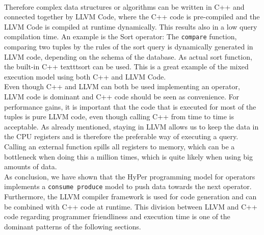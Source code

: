 \\
Therefore complex data structures or algorithms can be written in C++ and connected together by LLVM Code, where the C++ code is pre-compiled and the LLVM Code is compiled at runtime dynamically. This results also in a low query compilation time. An example is the Sort operator: The \texttt{compare} function, comparing two tuples by the rules of the sort query is dynamically generated in LLVM code, depending on the schema of the database. As actual sort function, the built-in C++ texttt{sort} can be used. This is a great example of the mixed execution model using both C++ and LLVM Code.
\\
Even though C++ and LLVM can both be used implementing an operator, LLVM code is dominant and C++ code should be seen as convenience. For performance gains, it is important that the code that is executed for most of the tuples is pure LLVM code, even though calling C++ from time to time is acceptable. As already mentioned, staying in LLVM allows us to keep the data in the CPU registers and is therefore the preferable way of executing a query. Calling an external function spills all registers to memory, which can be a bottleneck when doing this a million times, which is quite likely when using big amounts of data.
\\
As conclusion, we have shown that the HyPer programming model for operators implements a \texttt{consume produce} model to push data towards the next operator. Furthermore, the LLVM compiler framework is used for code generation and can be combined with C++ code at runtime. 
This division between LLVM and C++ code regarding programmer friendliness and execution time is one of the dominant patterns of the following sections.


